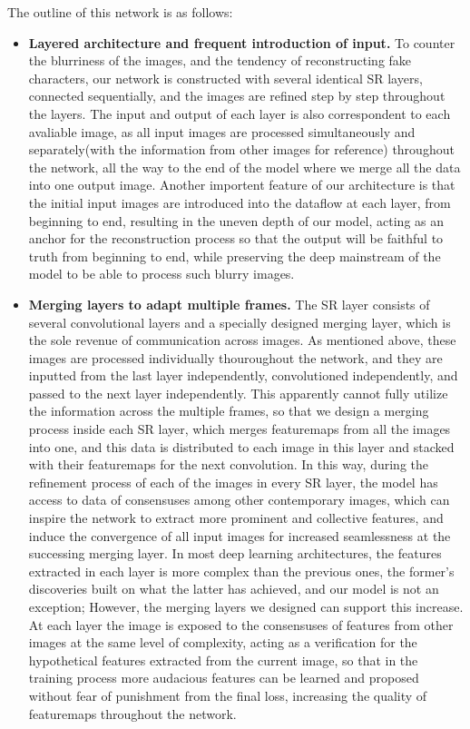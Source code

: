 The outline of this network is as follows:
\begin{itemize}[leftmargin=*]
  \item \textbf{Layered architecture and frequent introduction of input.} To counter the blurriness of the images, and the tendency of reconstructing fake characters, our network is constructed with several identical SR layers, connected sequentially, and the images are refined step by step throughout the layers. The input and output of each layer is also correspondent to each avaliable image, as all input images are processed simultaneously and separately(with the information from other images for reference) throughout the network, all the way to the end of the model where we merge all the data into one output image. Another importent feature of our architecture is that the initial input images are introduced into the dataflow at each layer, from beginning to end, resulting in the uneven depth of our model, acting as an anchor for the reconstruction process so that the output will be faithful to truth from beginning to end, while preserving the deep mainstream of the model to be able to process such blurry images.
  \item \textbf{Merging layers to adapt multiple frames.} The SR layer consists of several convolutional layers and a specially designed merging layer, which is the sole revenue of communication across images. As mentioned above, these images are processed individually thouroughout the network, and they are inputted from the last layer independently, convolutioned independently, and passed to the next layer independently. This apparently cannot fully utilize the information across the multiple frames, so that we design a merging process inside each SR layer, which merges featuremaps from all the images into one, and this data is distributed to each image in this layer and stacked with their featuremaps for the next convolution. In this way, during the refinement process of each of the images in every SR layer, the model has access to data of consensuses among other contemporary images, which can inspire the network to extract more prominent and collective features, and induce the convergence of all input images for increased seamlessness at the successing merging layer. In most deep learning architectures, the features extracted in each layer is more complex than the previous ones, the former's discoveries built on what the latter has achieved, and our model is not an exception; However, the merging layers we designed can support this increase. At each layer the image is exposed to the consensuses of features from other images at the same level of complexity, acting as a verification for the hypothetical features extracted from the current image, so that in the training process more audacious features can be learned and proposed without fear of punishment from the final loss, increasing the quality of featuremaps throughout the network.

\end{itemize}
